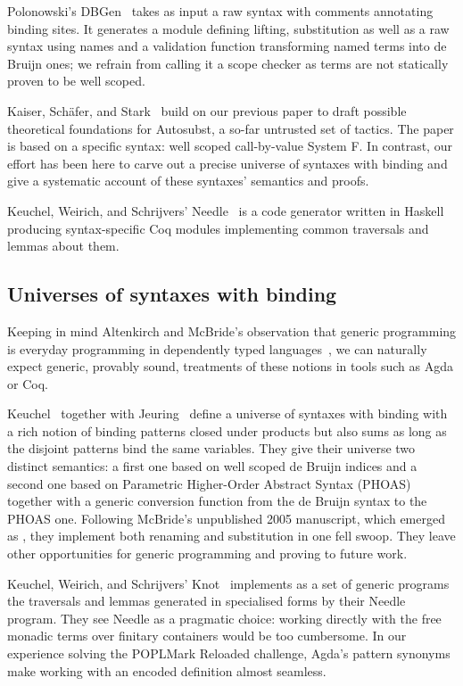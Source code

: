 {Polonowski's DBGen~\citeyear{polonowski:db} takes as input a raw syntax with
comments annotating binding sites. It generates a module defining lifting,
substitution as well as a raw syntax using names and a validation function
transforming named terms into de Bruijn ones; we refrain from calling it a
scope checker as terms are not statically proven to be well scoped.

Kaiser, Schäfer, and Stark~\citeyear{Kaiser-wsdebr} build on our previous paper
to draft possible theoretical foundations for Autosubst, a so-far untrusted
set of tactics. The paper is based on a specific syntax: well scoped call-by-value
System F. In contrast, our effort has been here to carve out
a precise universe of syntaxes with binding and give a systematic account
of these syntaxes' semantics and proofs.

Keuchel, Weirich, and Schrijvers' Needle~\citeyear{needleandknot} is a code
generator written in Haskell producing syntax-specific Coq modules
implementing common traversals and lemmas about them.

\subsection{Universes of syntaxes with binding} Keeping in mind Altenkirch
and McBride's observation that generic programming is everyday programming
in dependently typed languages~\citeyear{DBLP:conf/ifip2-1/AltenkirchM02}, we can naturally
expect generic, provably sound, treatments of these notions in tools such as
Agda or Coq.

Keuchel~\citeyear{Keuchel:Thesis:2011} together with Jeuring~\citeyear{DBLP:conf/icfp/KeuchelJ12}
define a universe of syntaxes with binding with a rich notion of binding patterns
closed under products but also sums as long as the disjoint patterns bind the same
variables. They give their universe two distinct semantics: a first one based on well
scoped de Bruijn indices and a second one based on Parametric Higher-Order Abstract
Syntax (PHOAS)~\cite{DBLP:conf/icfp/Chlipala08} together with a generic conversion
function from the de Bruijn syntax to the PHOAS one. Following McBride's unpublished 2005 manuscript, which emerged as \cite{benton2012strongly},
they implement both renaming and substitution in one fell swoop. They leave other
opportunities for generic programming and proving to future work.

Keuchel, Weirich, and Schrijvers' Knot~\citeyear{needleandknot} implements
as a set of generic programs the traversals and lemmas generated in specialised
forms by their Needle program. They see Needle as a pragmatic choice: working
directly with the free monadic terms over finitary containers would be too cumbersome. In
our experience solving the POPLMark Reloaded challenge, Agda's pattern
synonyms make working with an encoded definition almost
seamless.

}
